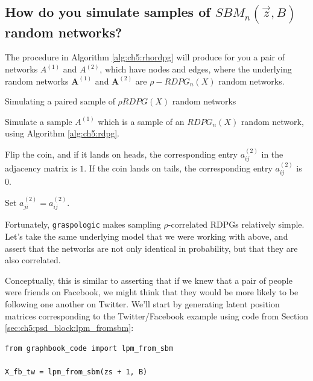 \subsection{How do you simulate samples of $SBM_n(\vec z, B)$ random networks?}

The procedure in Algorithm \ref{alg:ch5:rhordpg} will produce for you a pair of networks $A^{(1)}$ and $A^{(2)}$, which have nodes and edges, where the underlying random networks $\mathbf A^{(1)}$ and $\mathbf A^{(2)}$ are $\rho-RDPG_n(X)$ random networks.

\begin{algorithm}[h]\caption{Simulating a paired sample of $\rho RDPG(X)$ random networks}
\label{alg:ch5:rhordpg}
\SetAlgoLined
{}

Simulate a sample $A^{(1)}$ which is a sample  of an $RDPG_n(X)$ random network, using Algorithm \ref{alg:ch5:rdpg}.

 {
     {
         
        
        Flip the coin, and if it lands on heads, the corresponding entry $a_{ij}^{(2)}$ in the adjacency matrix is $1$. If the coin lands on tails, the corresponding entry $a_{ij}^{(2)}$ is $0$. 

        Set $a_{ji}^{(2)} = a_{ij}^{(2)}$.
    }
}


\end{algorithm}


Fortunately, \texttt{graspologic} makes sampling $\rho$-correlated RDPGs relatively simple. Let's take the same underlying model that we were working with above, and assert that the networks are not only identical in probability, but that they are also {correlated}. 

Conceptually, this is similar to asserting that if we knew that a pair of people were friends on Facebook, we might think that they would be more likely to be following one another on Twitter. We'll start by generating latent position matrices corresponding to the Twitter/Facebook example using code from Section \ref{sec:ch5:psd_block:lpm_fromsbm}:
\begin{lstlisting}[style=python]
from graphbook_code import lpm_from_sbm

X_fb_tw = lpm_from_sbm(zs + 1, B)
\end{lstlisting}

